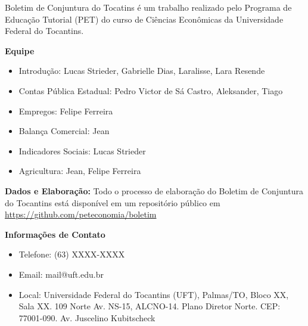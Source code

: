 \begin{tcolorbox}[colback=boxbackground, colframe=boxbackground, arc=0mm, top=15pt]
Boletim de Conjuntura do Tocatins é um trabalho realizado pelo Programa de Educação Tutorial (PET) do curso de Ciências Econômicas da Universidade Federal do Tocantins.
\\
\par{\bf Equipe}
\begin{itemize}
\item Introdução: Lucas Strieder, Gabrielle Dias, Laralisse, Lara Resende
\item Contas Pública Estadual: Pedro Victor de Sá Castro, Aleksander, Tiago
\item Empregos: Felipe Ferreira
\item Balança Comercial: Jean
\item Indicadores Sociais: Lucas Strieder
\item Agricultura: Jean, Felipe Ferreira
\end{itemize}
\par{\bf Dados e Elaboração:}
Todo o processo de elaboração do Boletim de Conjuntura do Tocantins está disponível em um repositório público em \url{https://github.com/peteconomia/boletim}
\\
\par{\bf Informações de Contato}
\begin{itemize}
	\item{Telefone:} (63) XXXX-XXXX
	\item{Email:} mail@uft.edu.br
	\item{Local:} Universidade Federal do Tocantins (UFT), Palmas/TO, Bloco XX, Sala XX. 109 Norte Av. NS-15, ALCNO-14. Plano Diretor Norte. CEP: 77001-090. Av. Juscelino Kubitscheck
\end{itemize}

\end{tcolorbox}
